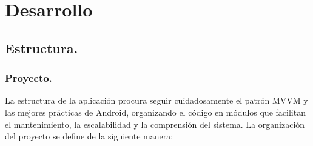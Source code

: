 \section{Desarrollo}
\label{sec:desarrollo}

\subsection{Estructura.}

\subsubsection{Proyecto.}

La estructura de la aplicación procura seguir cuidadosamente el patrón MVVM y las mejores prácticas de Android, organizando el código en módulos que facilitan el mantenimiento, la escalabilidad y la comprensión del sistema. La organización del proyecto se define de la siguiente manera:

